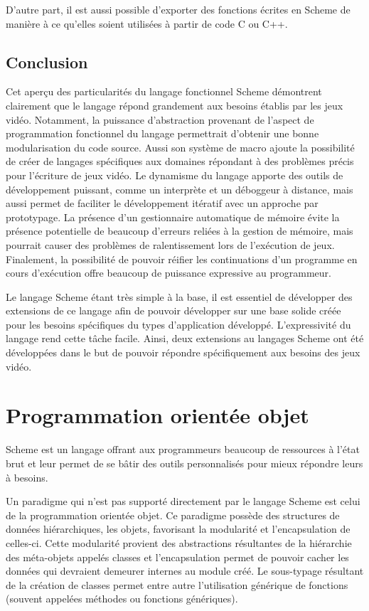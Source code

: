 \documentclass[12pt,oneside,letterpaper,francais]{book}
\begin{document}
D'autre part, il est aussi possible d'exporter des fonctions écrites
en Scheme de manière à ce qu'elles soient utilisées à partir de code C
ou C++.

\section{Conclusion}

Cet aperçu des particularités du langage fonctionnel Scheme démontrent
clairement que le langage répond grandement aux besoins établis par
les jeux vidéo. Notamment, la puissance d'abstraction provenant de
l'aspect de programmation fonctionnel du langage permettrait d'obtenir
une bonne modularisation du code source. Aussi son système de macro
ajoute la possibilité de créer de langages spécifiques aux domaines
répondant à des problèmes précis pour l'écriture de jeux vidéo. Le
dynamisme du langage apporte des outils de développement puissant,
comme un interprète et un déboggeur à distance, mais aussi permet de
faciliter le développement itératif avec un approche par
prototypage. La présence d'un gestionnaire automatique de mémoire
évite la présence potentielle de beaucoup d'erreurs reliées à la
gestion de mémoire, mais pourrait causer des problèmes de
ralentissement lors de l'exécution de jeux. Finalement, la possibilité
de pouvoir réifier les continuations d'un programme en cours
d'exécution offre beaucoup de puissance expressive au programmeur.

Le langage Scheme étant très simple à la base, il est essentiel de
développer des extensions de ce langage afin de pouvoir développer sur
une base solide créée pour les besoins spécifiques du types
d'application développé. L'expressivité du langage rend cette tâche
facile. Ainsi, deux extensions au langages Scheme ont été développées
dans le but de pouvoir répondre spécifiquement aux besoins des jeux
vidéo.


\chapter{Programmation orientée objet}
\label{Chap:OO}

Scheme est un langage offrant aux programmeurs beaucoup de ressources
à l'état brut et leur permet de se bâtir des outils personnalisés pour
mieux répondre leurs à besoins.

Un paradigme qui n'est pas supporté directement par le langage Scheme
est celui de la programmation orientée objet. Ce paradigme possède des
structures de données hiérarchiques, les objets, favorisant la
modularité et l'encapsulation de celles-ci. Cette modularité provient
des abstractions résultantes de la hiérarchie des méta-objets appelés
classes et l'encapsulation permet de pouvoir cacher les données qui
devraient demeurer internes au module créé.  Le sous-typage résultant
de la création de classes permet entre autre l'utilisation générique
de fonctions (souvent appelées méthodes ou fonctions génériques).
\end{document}
